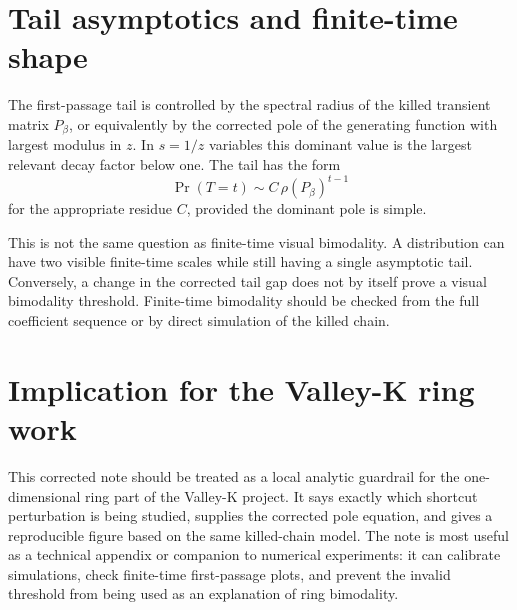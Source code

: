 \documentclass[11pt]{article}
\begin{document}
\section{Tail asymptotics and finite-time shape}

The first-passage tail is controlled by the spectral radius of the killed
transient matrix \(P_\beta\), or equivalently by the corrected pole of the
generating function with largest modulus in \(z\).  In \(s=1/z\) variables this
dominant value is the largest relevant decay factor below one.  The tail has the
form
\[
  \Pr(T=t) \sim C\,\rho(P_\beta)^{t-1}
\]
for the appropriate residue \(C\), provided the dominant pole is simple.

This is not the same question as finite-time visual bimodality.  A distribution
can have two visible finite-time scales while still having a single asymptotic
tail.  Conversely, a change in the corrected tail gap does not by itself prove a
visual bimodality threshold.  Finite-time bimodality should be checked from the
full coefficient sequence or by direct simulation of the killed chain.

\section{Implication for the Valley-K ring work}

This corrected note should be treated as a local analytic guardrail for the
one-dimensional ring part of the Valley-K project.  It says exactly which
shortcut perturbation is being studied, supplies the corrected pole equation,
and gives a reproducible figure based on the same killed-chain model.  The note
is most useful as a technical appendix or companion to numerical experiments:
it can calibrate simulations, check finite-time first-passage plots, and prevent
the invalid threshold from being used as an explanation of ring bimodality.
\end{document}
